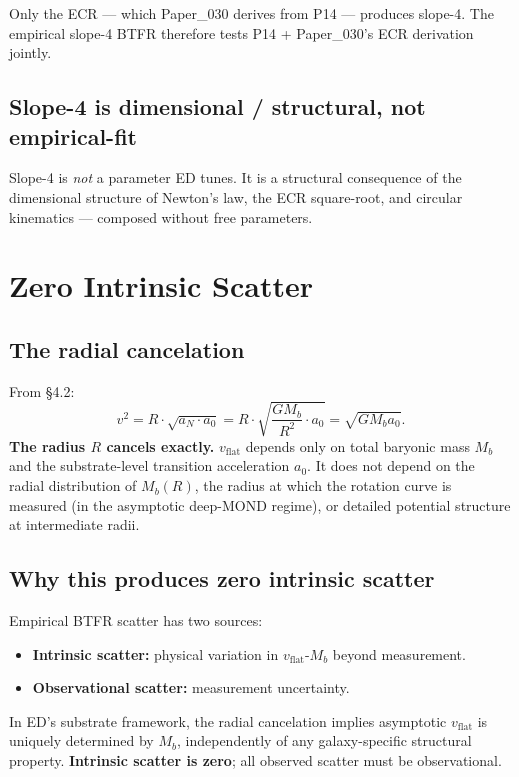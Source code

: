 \documentclass[11pt,a4paper]{article}
\begin{document}
Only the ECR --- which Paper\_030 derives from P14 --- produces slope-4. The empirical slope-4 BTFR therefore tests P14 + Paper\_030's ECR derivation jointly.

\subsection{Slope-4 is dimensional / structural, not empirical-fit}

Slope-4 is \emph{not} a parameter ED tunes. It is a structural consequence of the dimensional structure of Newton's law, the ECR square-root, and circular kinematics --- composed without free parameters.

\section{Zero Intrinsic Scatter}

\subsection{The radial cancelation}

From \S4.2:
\[
v^2 = R \cdot \sqrt{a_N \cdot a_0} = R \cdot \sqrt{\frac{GM_b}{R^2} \cdot a_0} = \sqrt{GM_b a_0}.
\]
\textbf{The radius $R$ cancels exactly.} $v_\mathrm{flat}$ depends only on total baryonic mass $M_b$ and the substrate-level transition acceleration $a_0$. It does not depend on the radial distribution of $M_b(R)$, the radius at which the rotation curve is measured (in the asymptotic deep-MOND regime), or detailed potential structure at intermediate radii.

\subsection{Why this produces zero intrinsic scatter}

Empirical BTFR scatter has two sources:

\begin{itemize}[noitemsep]
\item \textbf{Intrinsic scatter:} physical variation in $v_\mathrm{flat}$-$M_b$ beyond measurement.
\item \textbf{Observational scatter:} measurement uncertainty.
\end{itemize}

In ED's substrate framework, the radial cancelation implies asymptotic $v_\mathrm{flat}$ is uniquely determined by $M_b$, independently of any galaxy-specific structural property. \textbf{Intrinsic scatter is zero}; all observed scatter must be observational.
\end{document}
